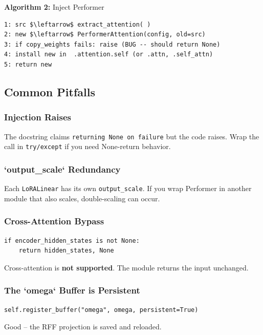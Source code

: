 \textbf{Algorithm 2:} Inject Performer
\begin{lstlisting}
1: src $\leftarrow$ extract_attention( )
2: new $\leftarrow$ PerformerAttention(config, old=src)
3: if copy_weights fails: raise (BUG -- should return None)
4: install new in  .attention.self (or .attn, .self_attn)
5: return new
\end{lstlisting}

\subsection{Common Pitfalls}

\subsubsection{Injection Raises}

The docstring claims \texttt{returning None on failure} but the code raises. 
Wrap the call in \texttt{try/except} if you need None-return behavior.

\subsubsection{`output\_scale` Redundancy}

Each \texttt{LoRALinear} has its own \texttt{output\_scale}. If you wrap Performer in 
another module that also scales, double-scaling can occur.

\subsubsection{Cross-Attention Bypass}

\begin{lstlisting}
if encoder_hidden_states is not None:
    return hidden_states, None
\end{lstlisting}

Cross-attention is \textbf{not supported}. The module returns the input 
unchanged.

\subsubsection{The `omega` Buffer is Persistent}

\begin{lstlisting}
self.register_buffer("omega", omega, persistent=True)
\end{lstlisting}

Good -- the RFF projection is saved and reloaded.

